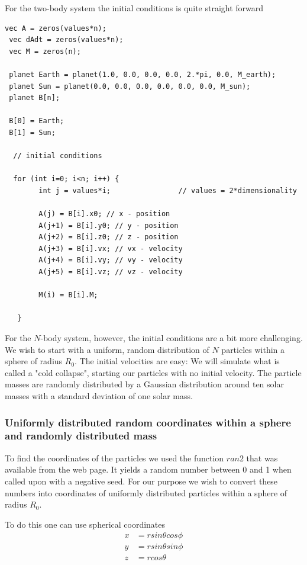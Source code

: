 \documentclass[a4paper,12pt, english]{article}
\begin{document}
For the two-body system the initial conditions is quite straight forward

 \begin{lstlisting}[title={Initial conditions two-body system}]
 vec A = zeros(values*n);
 vec dAdt = zeros(values*n);
 vec M = zeros(n);

 planet Earth = planet(1.0, 0.0, 0.0, 0.0, 2.*pi, 0.0, M_earth);
 planet Sun = planet(0.0, 0.0, 0.0, 0.0, 0.0, 0.0, M_sun);
 planet B[n];

 B[0] = Earth;
 B[1] = Sun;

  // initial conditions

  for (int i=0; i<n; i++) {
        int j = values*i;                // values = 2*dimensionality
       
        A(j) = B[i].x0; // x - position
        A(j+1) = B[i].y0; // y - position
        A(j+2) = B[i].z0; // z - position
        A(j+3) = B[i].vx; // vx - velocity
        A(j+4) = B[i].vy; // vy - velocity
        A(j+5) = B[i].vz; // vz - velocity

        M(i) = B[i].M;
        
   }
\end{lstlisting}
 
 
For the $N$-body system, however, the initial conditions are a bit more challenging. We wish to start with a uniform, random distribution of $N$ particles within a sphere of radius $R_0$. The initial velocities are easy: We will simulate what is called a "cold collapse", starting our particles with no initial velocity. The particle masses are randomly distributed by a Gaussian distribution around ten solar masses with a standard deviation of one solar mass.


\subsubsection*{Uniformly distributed random coordinates within a sphere and randomly distributed mass}

To find the coordinates of the particles we used the function $ran2$ that was available from the web page. It yields a random number between 0 and 1 when called upon with a negative seed. For our purpose we wish to convert these numbers into coordinates of uniformly distributed particles within a sphere of radius $R_0$.

To do this one can use spherical coordinates
\begin{equation}
\begin{split}
x &= r sin \theta cos \phi \\
y &= r sin \theta sin \phi \\
z &= r cos \theta
\end{split}
\end{equation}
\end{document}
